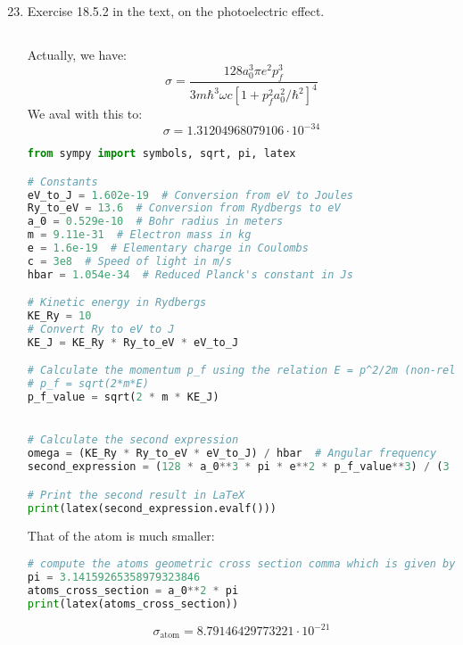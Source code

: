 \documentclass[12pt]{article}
\begin{document}
\section{}
\begin{enumerate}
  \setcounter{enumi}{22}
  \item Exercise 18.5.2 in the text, on the photoelectric effect.
\subsection{}
Actually, we have:
\begin{equation}
  \sigma =\frac{128 a_0^3 \pi e^2 p_f^3}{3 m \hbar^3 \omega c\left[1+p_f^2 a_0^2 / \hbar^2\right]^4}
\end{equation}
We aval with this to:
\begin{equation}
  \sigma = 1.31204968079106 \cdot 10^{-34}
\end{equation}
\begin{lstlisting}[language=Python]
from sympy import symbols, sqrt, pi, latex

# Constants
eV_to_J = 1.602e-19  # Conversion from eV to Joules
Ry_to_eV = 13.6  # Conversion from Rydbergs to eV
a_0 = 0.529e-10  # Bohr radius in meters
m = 9.11e-31  # Electron mass in kg
e = 1.6e-19  # Elementary charge in Coulombs
c = 3e8  # Speed of light in m/s
hbar = 1.054e-34  # Reduced Planck's constant in Js

# Kinetic energy in Rydbergs
KE_Ry = 10
# Convert Ry to eV to J
KE_J = KE_Ry * Ry_to_eV * eV_to_J

# Calculate the momentum p_f using the relation E = p^2/2m (non-relativistic kinetic energy)
# p_f = sqrt(2*m*E)
p_f_value = sqrt(2 * m * KE_J)


# Calculate the second expression
omega = (KE_Ry * Ry_to_eV * eV_to_J) / hbar  # Angular frequency
second_expression = (128 * a_0**3 * pi * e**2 * p_f_value**3) / (3 * m * hbar**3 * omega * c * (1 + p_f_value**2 * a_0**2 / hbar**2)**4)

# Print the second result in LaTeX
print(latex(second_expression.evalf()))
\end{lstlisting}
That of the atom is much smaller:
\begin{lstlisting}[language=Python]
# compute the atoms geometric cross section comma which is given by a_0^2\pi
pi = 3.14159265358979323846
atoms_cross_section = a_0**2 * pi
print(latex(atoms_cross_section))
\end{lstlisting}
\begin{equation}
  \sigma_{\text{atom}} = 8.79146429773221 \cdot 10^{-21}
\end{equation}

\end{enumerate}
\end{document}
